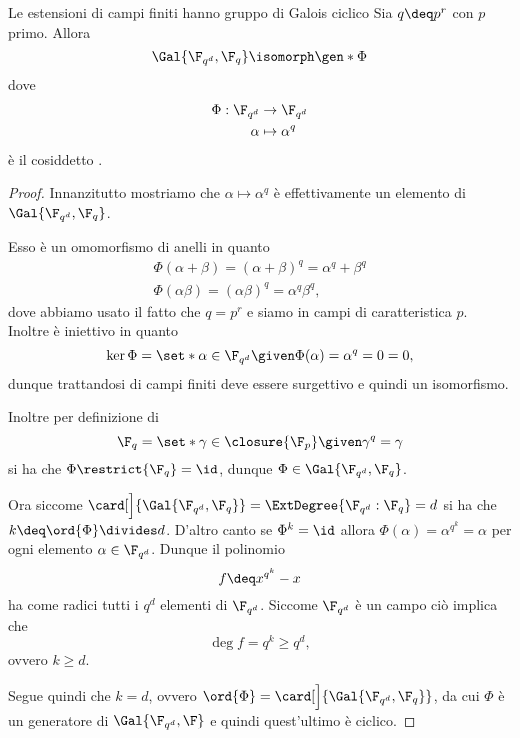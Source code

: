 \begin{theorem}
    {Le estensioni di campi finiti hanno gruppo di Galois ciclico}{}
    Sia $q \deq p^r$ con $p$ primo. Allora \[
        \Gal{\F_{q^d}, \F_{q}} \isomorph \gen*{\Phi}
    \] dove \begin{equation}
        \begin{aligned}
            \Phi : \F_{q^d} &\to \F_{q^d}\\
            \alpha &\mapsto \alpha^q
        \end{aligned}
    \end{equation} è il cosiddetto .
\end{theorem}
\begin{proof}
    Innanzitutto mostriamo che $\alpha \mapsto \alpha^q$ è effettivamente un elemento di $\Gal{\F_{q^d}, \F_q}$.
    
    Esso è un omomorfismo di anelli in quanto \begin{gather*}
        \Phi(\alpha + \beta) = (\alpha + \beta)^{q} = \alpha^q + \beta^q\\
        \Phi(\alpha\beta) = (\alpha\beta)^q = \alpha^q\beta^q,
    \end{gather*} dove abbiamo usato il fatto che $q = p^r$ e siamo in campi di caratteristica $p$. Inoltre è iniettivo in quanto \[
        \ker \Phi = \set*{\alpha \in \F_{q^d} \given \Phi(\alpha) = \alpha^q = 0} = {0},
    \] dunque trattandosi di campi finiti deve essere surgettivo e quindi un isomorfismo.

    Inoltre per definizione di \[
        \F_q = \set*{\gamma \in \closure{\F_p} \given \gamma^q = \gamma}
    \] si ha che $\Phi\restrict{\F_q} = \id$, dunque $\Phi \in \Gal{\F_{q^d}, \F_q}$.
    
    Ora siccome $\card[\Big]{\Gal{\F_{q^d}, \F_q}} = \ExtDegree{\F_{q^d} : \F_q} = d$ si ha che $k \deq \ord{\Phi} \divides d$. D'altro canto se $\Phi^k = \id$ allora $\Phi(\alpha) = \alpha^{q^k} = \alpha$ per ogni elemento $\alpha \in \F_{q^d}$. Dunque il polinomio \[
        f \deq x^{q^k} - x
    \] ha come radici tutti i $q^d$ elementi di $\F_{q^d}$. Siccome $\F_{q^d}$ è un campo ciò implica che \[
        \deg f = q^k \geq q^d,
    \] ovvero $k \geq d$.
    
    Segue quindi che $k = d$, ovvero $\ord{\Phi} = \card[\Big]{\Gal{\F_{q^d}, \F_q}}$, da cui $\Phi$ è un generatore di $\Gal{\F_{q^d}, \F}$ e quindi quest'ultimo è ciclico. 
\end{proof}

